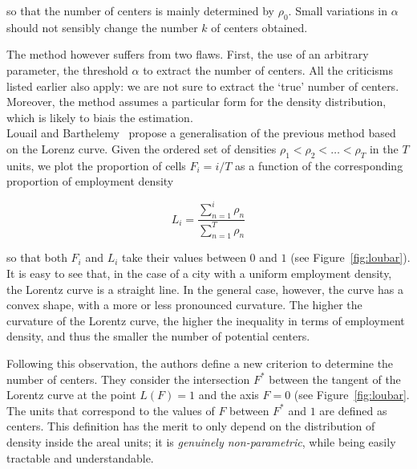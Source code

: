so that the number of centers is mainly determined by $\rho_0$. Small variations
in $\alpha$ should not sensibly change the number $k$ of centers obtained.

The method however suffers from two flaws. First, the use of an arbitrary
parameter, the threshold $\alpha$ to extract the number of centers. All the criticisms listed earlier also apply: we are not sure to extract the
`true' number of centers. Moreover, the method assumes a particular form for
the density distribution, which is likely to biais the estimation.\\

Louail and Barthelemy~\cite{Louail:2014} propose a generalisation of the
previous method based on the Lorenz curve.  Given the ordered set of
densities $\rho_1 < \rho_2 < \dots < \rho_T$ in the $T$ units, we plot the
proportion of cells $F_i=i/T$ as a function of the corresponding proportion of
employment density

\begin{equation}
    L_i = \frac{\sum_{n=1}^i \rho_n}{\sum_{n=1}^T \rho_n}
\end{equation}

so that both $F_i$ and $L_i$ take their values between $0$ and $1$ (see 
Figure~\ref{fig:loubar}). It is easy
to see that, in the case of a city with a uniform employment density, the
Lorentz curve is a straight line. In the general case, however, the curve has a
convex shape, with a more or less pronounced curvature.  The higher the
curvature of the Lorentz curve, the higher the inequality in terms of employment
density, and thus the smaller the number of potential centers. 

Following this observation, the authors define a new criterion to determine the number of
centers. They consider the intersection $F^*$ between the tangent of the
Lorentz curve at the point $L(F) = 1$ and the axis $F=0$ (see
Figure~\ref{fig:loubar}. The units that correspond to the values of $F$ between
$F^*$ and $1$ are defined as centers. This definition has the merit to only
depend on the distribution of density inside the areal units; it is \emph{genuinely
non-parametric}, while being easily tractable and understandable.\\

